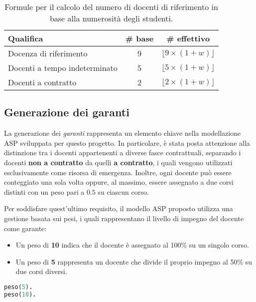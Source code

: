 \begin{table}[h]
    \centering
    \renewcommand{\arraystretch}{1.5}
    \begin{tabular}{|l|c|c|}
    \hline
    \textbf{Qualifica} & \textbf{\# base} & \textbf{\# effettivo} \\
    \hline
    Docenza di riferimento & 9 & $\lfloor 9 \times (1+w) \rfloor$ \\
    \hline
    Docenti a tempo indeterminato & 5 & $\lfloor 5 \times (1+w) \rfloor$ \\
    \hline
    Docenti a contratto & 2 & $\lfloor 2 \times (1+w) \rfloor$ \\
    \hline
    \end{tabular}
    \caption{Formule per il calcolo del numero di docenti di riferimento in base alla numerosità degli studenti.}
    \label{tab:formula-w}
\end{table}

\subsection{Generazione dei garanti}\label{sec:garanti}

La generazione dei \textit{garanti} rappresenta un elemento chiave nella modellazione ASP 
sviluppata per questo progetto. In particolare, è stata posta attenzione alla distinzione 
tra i docenti appartenenti a diverse fasce contrattuali, separando i docenti 
\textbf{non a contratto} da quelli \textbf{a contratto}, i quali vengono utilizzati 
esclusivamente come risorsa di emergenza.
Inoltre, ogni docente può essere conteggiato una sola volta oppure, al massimo, essere 
assegnato a due corsi distinti con un peso pari a $0.5$ su ciascun corso. 

Per soddisfare quest'ultimo requisito, il modello ASP proposto utilizza una gestione 
basata sui pesi, i quali rappresentano il livello di impegno del docente come garante:
\begin{itemize}
    \item Un peso di \textbf{10} indica che il docente è assegnato al 100\% su un singolo corso.
    \item Un peso di \textbf{5} rappresenta un docente che divide il proprio impegno al 50\% su due corsi diversi.
\end{itemize}

\begin{lstlisting}[language=prolog, caption=Generazione dei pesi.]
% Predicati di base per definire i pesi possibili.
peso(5).
peso(10).
\end{lstlisting}

